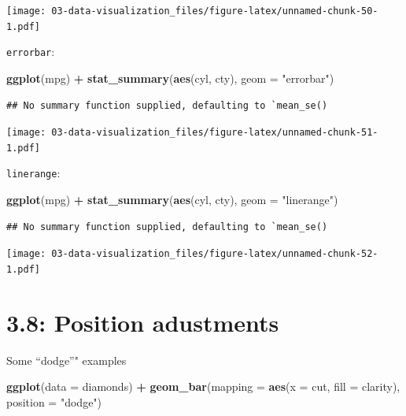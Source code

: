 \documentclass[]{book}
\newenvironment{Shaded}{\begin{snugshade}}{\end{snugshade}}
\newcommand{\DataTypeTok}[1]{\textcolor[rgb]{0.13,0.29,0.53}{#1}}
\newcommand{\KeywordTok}[1]{\textcolor[rgb]{0.13,0.29,0.53}{\textbf{#1}}}
\newcommand{\NormalTok}[1]{#1}
\newcommand{\OperatorTok}[1]{\textcolor[rgb]{0.81,0.36,0.00}{\textbf{#1}}}
\newcommand{\StringTok}[1]{\textcolor[rgb]{0.31,0.60,0.02}{#1}}
\theoremstyle{definition}
\theoremstyle{definition}
\theoremstyle{definition}
\theoremstyle{remark}
\begin{document}
\texttt{[image: 03-data-visualization\_files/figure-latex/unnamed-chunk-50-1.pdf]}

\texttt{errorbar}:

\begin{Shaded}
\begin{Highlighting}[]
\KeywordTok{ggplot}\NormalTok{(mpg) }\OperatorTok{+}
\StringTok{  }\KeywordTok{stat_summary}\NormalTok{(}\KeywordTok{aes}\NormalTok{(cyl, cty), }\DataTypeTok{geom =} \StringTok{"errorbar"}\NormalTok{)}
\end{Highlighting}
\end{Shaded}

\begin{verbatim}
## No summary function supplied, defaulting to `mean_se()
\end{verbatim}

\texttt{[image: 03-data-visualization\_files/figure-latex/unnamed-chunk-51-1.pdf]}

\texttt{linerange}:

\begin{Shaded}
\begin{Highlighting}[]
\KeywordTok{ggplot}\NormalTok{(mpg) }\OperatorTok{+}
\StringTok{  }\KeywordTok{stat_summary}\NormalTok{(}\KeywordTok{aes}\NormalTok{(cyl, cty), }\DataTypeTok{geom =} \StringTok{"linerange"}\NormalTok{)}
\end{Highlighting}
\end{Shaded}

\begin{verbatim}
## No summary function supplied, defaulting to `mean_se()
\end{verbatim}

\texttt{[image: 03-data-visualization\_files/figure-latex/unnamed-chunk-52-1.pdf]}

\hypertarget{position-adustments}{%
\section{3.8: Position adustments}\label{position-adustments}}

Some ``dodge''" examples

\begin{Shaded}
\begin{Highlighting}[]
\KeywordTok{ggplot}\NormalTok{(}\DataTypeTok{data =}\NormalTok{ diamonds) }\OperatorTok{+}\StringTok{ }
\StringTok{  }\KeywordTok{geom_bar}\NormalTok{(}\DataTypeTok{mapping =} \KeywordTok{aes}\NormalTok{(}\DataTypeTok{x =}\NormalTok{ cut, }\DataTypeTok{fill =}\NormalTok{ clarity), }\DataTypeTok{position =} \StringTok{"dodge"}\NormalTok{)}
\end{Highlighting}
\end{Shaded}
\end{document}
